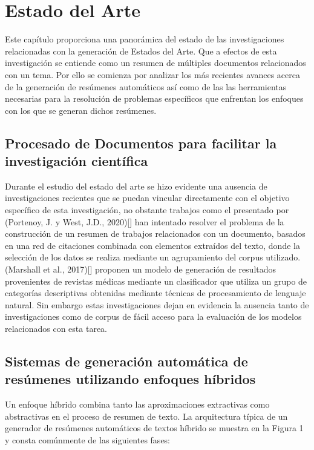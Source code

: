 \chapter{Estado del Arte}\label{chapter:state-of-the-art}
    Este capítulo proporciona una panorámica del estado de las investigaciones relacionadas con la generación de Estados del Arte. Que a efectos de esta investigación se entiende como un resumen de múltiples documentos relacionados con un tema. Por ello se comienza por analizar los más recientes avances acerca de la generación de resúmenes automáticos así como de las las herramientas necesarias para la resolución de problemas específicos que enfrentan los enfoques con los que se generan dichos resúmenes.

\section{Procesado de Documentos para facilitar la investigación científica}
Durante el estudio del estado del arte se hizo evidente una ausencia de investigaciones recientes que se puedan vincular directamente con el objetivo específico de esta investigación, no obstante trabajos como el presentado por (Portenoy, J. y West, J.D., 2020)[\cite{portenoy2020constructing}] han intentado resolver el problema de la construcción de un resumen de trabajos relacionados con un documento, basados en una red de citaciones combinada con elementos extraídos del texto, donde la selección de los datos se realiza mediante un agrupamiento del corpus utilizado. (Marshall et al., 2017)[\cite{marshall}] 
proponen un modelo de generación de resultados provenientes de revistas médicas mediante un clasificador que utiliza un grupo de categorías descriptivas obtenidas mediante técnicas de procesamiento de lenguaje natural. Sin embargo estas investigaciones dejan en evidencia la ausencia tanto de investigaciones como de corpus de fácil acceso para la evaluación de los modelos relacionados con esta tarea.

\section{Sistemas de generación automática de resúmenes utilizando enfoques híbridos}

Un enfoque híbrido combina tanto las aproximaciones extractivas como abstractivas en el proceso de resumen de texto. La arquitectura típica  de un generador de resúmenes automáticos de textos híbrido se muestra en la Figura 1 y consta comúnmente de las siguientes fases:

